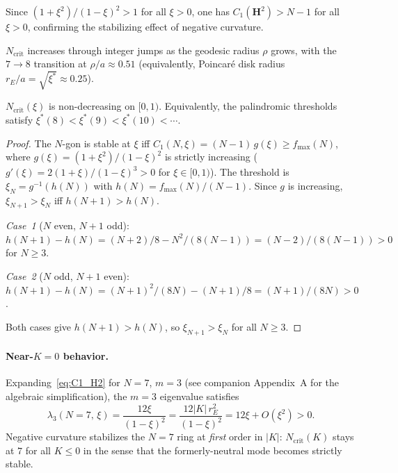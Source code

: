 Since $(1+\xi^2)/(1-\xi)^2 > 1$ for all $\xi > 0$,
one has $C_1(\mathbf{H}^2) > N{-}1$ for all $\xi > 0$, confirming the
stabilizing effect of negative curvature.

$N_{\mathrm{crit}}$ increases through integer jumps as the geodesic
radius $\rho$ grows,
with the $7 \to 8$ transition at $\rho/a \approx 0.51$
(equivalently, Poincar\'e disk radius $r_E/a = \sqrt{\xi^*} \approx 0.25$).

\begin{proposition}
\label{prop:ncrit-monotone}
$N_{\mathrm{crit}}(\xi)$ is non-decreasing on $[0, 1)$.
Equivalently, the palindromic thresholds satisfy
$\xi^*(8) < \xi^*(9) < \xi^*(10) < \cdots$.
\end{proposition}

\begin{proof}
The $N$-gon is stable at $\xi$ iff
$C_1(N,\xi) = (N{-}1)\,g(\xi) \ge f_{\max}(N)$,
where $g(\xi) = (1{+}\xi^2)/(1{-}\xi)^2$ is strictly
increasing ($g'(\xi) = 2(1{+}\xi)/(1{-}\xi)^3 > 0$
for $\xi \in [0,1)$).
The threshold is $\xi_N = g^{-1}(h(N))$ with
$h(N) = f_{\max}(N)/(N{-}1)$.
Since $g$ is increasing,
$\xi_{N+1} > \xi_N$ iff $h(N{+}1) > h(N)$.

\emph{Case~1} ($N$ even, $N{+}1$ odd):
$h(N{+}1) - h(N) = (N{+}2)/8 - N^2/(8(N{-}1))
= (N{-}2)/(8(N{-}1)) > 0$ for $N \ge 3$.

\emph{Case~2} ($N$ odd, $N{+}1$ even):
$h(N{+}1) - h(N) = (N{+}1)^2/(8N) - (N{+}1)/8
= (N{+}1)/(8N) > 0$.

Both cases give $h(N{+}1) > h(N)$, so
$\xi_{N+1} > \xi_N$ for all $N \ge 3$.
\end{proof}

\paragraph{Near-$K=0$ behavior.}
Expanding~\eqref{eq:C1_H2} for $N=7$, $m=3$ (see
companion Appendix~A for the algebraic simplification), the
$m=3$ eigenvalue satisfies
\begin{equation}
  \lambda_3(N=7,\,\xi)
    = \frac{12\xi}{(1-\xi)^2}
    = \frac{12|K|\,r_E^2}{(1-\xi)^2}
    = 12\xi + O(\xi^2) > 0 .
  \label{eq:lam3_H2}
\end{equation}
Negative curvature stabilizes the $N=7$ ring at \emph{first} order in
$|K|$: $N_\mathrm{crit}(K)$ stays at $7$ for all $K \le 0$ in the
sense that the formerly-neutral mode becomes strictly stable.

